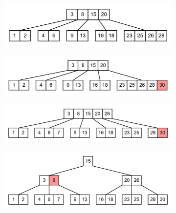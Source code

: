 \documentclass[11pt,a4paper]{article}
\begin{document}
\begin{loesung}
\begin{enumerate}
\begin{figure}[h!]
            \begin{subfigure}[b]{0.45\textwidth}
                \centering
                \includegraphics[width=\textwidth]{img/3c/4}
            \end{subfigure}
            \begin{subfigure}[b]{0.45\textwidth}
                \centering
                \includegraphics[width=\textwidth]{img/3c/5}
            \end{subfigure}
            \begin{subfigure}[b]{0.45\textwidth}
                \centering
                \includegraphics[width=\textwidth]{img/3c/6}
            \end{subfigure}
            \begin{subfigure}[b]{0.45\textwidth}
                \centering
                \includegraphics[width=\textwidth]{img/3c/7}
            \end{subfigure}
            \begin{subfigure}[b]{0.45\textwidth}
                \centering

\end{subfigure}
\end{figure}
\end{enumerate}
\end{loesung}
\end{document}
